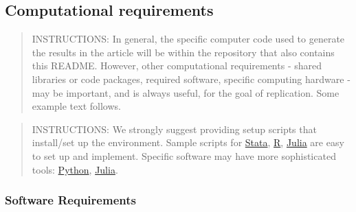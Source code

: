 \documentclass[10pt]{article}
\begin{document}
\hypertarget{computational-requirements}{%
\subsection{Computational
requirements}\label{computational-requirements}}




\begin{quote}
INSTRUCTIONS: In general, the specific computer code used to generate
the results in the article will be within the repository that also
contains this README. However, other computational requirements - shared
libraries or code packages, required software, specific computing
hardware - may be important, and is always useful, for the goal of
replication. Some example text follows.
\end{quote}

\begin{quote}
INSTRUCTIONS: We strongly suggest providing setup scripts that
install/set up the environment. Sample scripts for
\href{https://github.com/gslab-econ/template/blob/master/config/config_stata.do}{Stata},
\href{https://github.com/labordynamicsinstitute/paper-template/blob/master/programs/global-libraries.R}{R},
\href{https://github.com/labordynamicsinstitute/paper-template/blob/master/programs/packages.jl}{Julia}
are easy to set up and implement. Specific software may have more
sophisticated tools:
\href{https://pip.pypa.io/en/stable/user_guide/\#ensuring-repeatability}{Python},
\href{https://julia.quantecon.org/more_julia/tools_editors.html\#Package-Environments}{Julia}.
\end{quote}

\hypertarget{software-requirements}{%
\subsubsection{Software Requirements}\label{software-requirements}}

\end{document}
